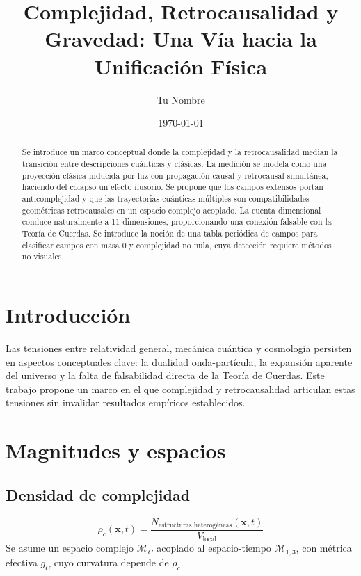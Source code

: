 \documentclass[reprint,amsmath,amssymb,aps]{revtex4-2}
\begin{document}
\title{Complejidad, Retrocausalidad y Gravedad: Una Vía hacia la Unificación Física}
\author{Tu Nombre}
\date{\today}

\begin{abstract}
Se introduce un marco conceptual donde la complejidad y la retrocausalidad median la transición entre descripciones cuánticas y clásicas. La medición se modela como una proyección clásica inducida por luz con propagación causal y retrocausal simultánea, haciendo del colapso un efecto ilusorio. Se propone que los campos extensos portan anticomplejidad y que las trayectorias cuánticas múltiples son compatibilidades geométricas retrocausales en un espacio complejo acoplado. La cuenta dimensional conduce naturalmente a 11 dimensiones, proporcionando una conexión falsable con la Teoría de Cuerdas. Se introduce la noción de una tabla periódica de campos para clasificar campos con masa 0 y complejidad no nula, cuya detección requiere métodos no visuales.
\end{abstract}

\maketitle

\section{Introducción}
Las tensiones entre relatividad general, mecánica cuántica y cosmología persisten en aspectos conceptuales clave: la dualidad onda-partícula, la expansión aparente del universo y la falta de falsabilidad directa de la Teoría de Cuerdas. Este trabajo propone un marco en el que complejidad y retrocausalidad articulan estas tensiones sin invalidar resultados empíricos establecidos.

\section{Magnitudes y espacios}
\subsection{Densidad de complejidad}
\begin{equation}
\rho_c(\mathbf{x},t) = \frac{N_{\text{estructuras heterogéneas}}(\mathbf{x},t)}{V_{\text{local}}}
\end{equation}
Se asume un espacio complejo $\mathcal{M}_C$ acoplado al espacio-tiempo $\mathcal{M}_{1,3}$, con métrica efectiva $g_C$ cuyo curvatura depende de $\rho_c$.
\end{document}
